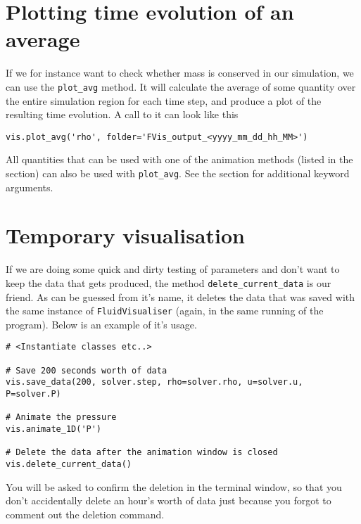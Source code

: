 \documentclass{article}
\newcommand{\ttt}[1]{\texttt{#1}}
\begin{document}
\section{Plotting time evolution of an average}
\label{sec:plot}
If we for instance want to check whether mass is conserved in our simulation, we can use the \ttt{plot\_avg} method. It will calculate the average of some quantity over the entire simulation region for each time step, and produce a plot of the resulting time evolution. A call to it can look like this
\begin{lstlisting}
vis.plot_avg('rho', folder='FVis_output_<yyyy_mm_dd_hh_MM>')
\end{lstlisting}
All quantities that can be used with one of the animation methods (listed in the  section) can also be used with \ttt{plot\_avg}. See the  section for additional keyword arguments.

\section{Temporary visualisation}
\label{sec:temp}
If we are doing some quick and dirty testing of parameters and don't want to keep the data that gets produced, the method \ttt{delete\_current\_data} is our friend. As can be guessed from it's name, it deletes the data that was saved with the same instance of \ttt{FluidVisualiser} (again, in the same running of the program). Below is an example of it's usage.\\
\begin{minipage}{\linewidth}
\begin{lstlisting}
# <Instantiate classes etc..>

# Save 200 seconds worth of data
vis.save_data(200, solver.step, rho=solver.rho, u=solver.u, P=solver.P)

# Animate the pressure
vis.animate_1D('P')

# Delete the data after the animation window is closed
vis.delete_current_data()
\end{lstlisting}
\end{minipage}
You will be asked to confirm the deletion in the terminal window, so that you don't accidentally delete an hour's worth of data just because you forgot to comment out the deletion command.
\end{document}
